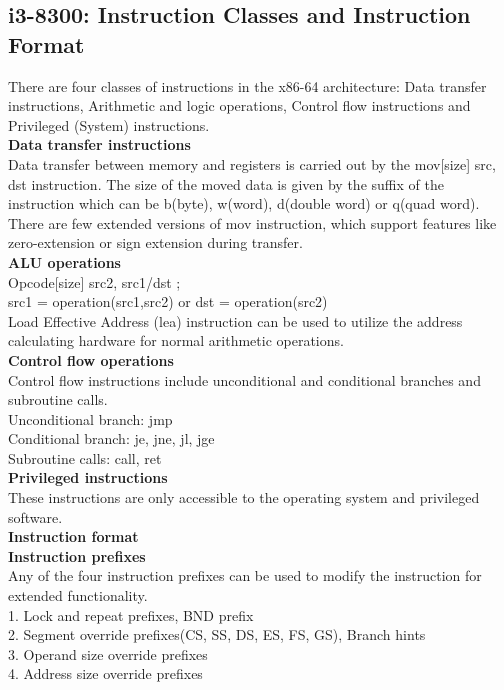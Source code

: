 \subsection{i3-8300: Instruction Classes and Instruction Format}
There are four classes of instructions in the x86-64 architecture: Data transfer instructions, Arithmetic and logic operations, Control flow instructions and Privileged (System) instructions.\\
\textbf{Data transfer instructions}\\
Data transfer between memory and registers is carried out by the mov[size] src, dst instruction. The size of the moved data is given by the suffix of the instruction which can be b(byte), w(word), d(double word) or q(quad word). There are few extended versions of mov instruction, which support features like zero-extension or sign extension during transfer.\\
\textbf{ALU operations}\\
Opcode[size] src2, src1/dst ;\\
src1 = operation(src1,src2) or dst = operation(src2)\\
Load Effective Address (lea) instruction can be used to utilize the address calculating hardware for normal arithmetic operations.\\
\textbf{Control flow operations}\\
Control flow instructions include unconditional and conditional branches and subroutine calls.\\
Unconditional branch: jmp\\
Conditional branch: je, jne, jl, jge\\
Subroutine calls: call, ret\\
\textbf{Privileged instructions}\\
These instructions are only accessible to the operating system and privileged software.\\
\textbf{Instruction format}\\
\textbf{Instruction prefixes}\\
Any of the four instruction prefixes can be used to modify the instruction for extended functionality.\\
1.	Lock and repeat prefixes, BND prefix\\
2.	Segment override prefixes(CS, SS, DS, ES, FS, GS), Branch hints\\
3.	Operand size override prefixes\\
4.	Address size override prefixes\\
